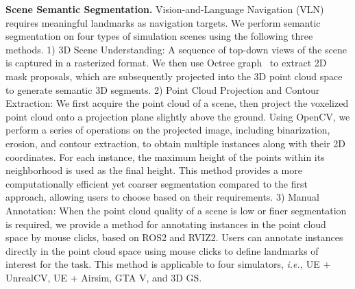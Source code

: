 \textbf{Scene Semantic Segmentation.} 
Vision-and-Language Navigation (VLN) requires meaningful landmarks as navigation targets. We perform semantic segmentation on four types of simulation scenes using the following three methods. 1) 3D Scene Understanding: A sequence of top-down views of the scene is captured in a rasterized format. We then use Octree graph~\cite{octree_graph} to extract 2D mask proposals, which are subsequently projected into the 3D point cloud space to generate semantic 3D segments. 2) Point Cloud Projection and Contour Extraction: We first acquire the point cloud of a scene, then project the voxelized point cloud onto a projection plane slightly above the ground. Using OpenCV, we perform a series of operations on the projected image, including binarization, erosion, and contour extraction, to obtain multiple instances along with their 2D coordinates. For each instance, the maximum height of the points within its neighborhood is used as the final height. This method provides a more computationally efficient yet coarser segmentation compared to the first approach, allowing users to choose based on their requirements. 3) Manual Annotation: When the point cloud quality of a scene is low or finer segmentation is required, we provide a method for annotating instances in the point cloud space by mouse clicks, based on ROS2 and RVIZ2. Users can annotate instances directly in the point cloud space using mouse clicks to define landmarks of interest for the task. This method is applicable to four simulators, \emph{i.e.,} UE + UnrealCV, UE + Airsim, GTA V, and 3D GS.

\begin{comment}
\begin{figure}
    \centering
    \begin{subfigure}[b]{0.15\textwidth}   %
        \centering
        \texttt{[image: Fig/whole\_scene.pdf]} %
        \caption{}
        \label{fig:sub1}
    \end{subfigure}
    \hfill  %
    \begin{subfigure}[b]{0.15\textwidth}
        \centering
        \texttt{[image: Fig/scene\_point\_cloud.pdf]}
        \caption{}
        \label{fig:sub2}
    \end{subfigure}
    \hfill
    \begin{subfigure}[b]{0.15\textwidth}
        \centering
        \texttt{[image: Fig/scene\_seg.pdf]}
        \caption{}
        \label{fig:sub3}
    \end{subfigure}
    
    \caption{Illustration of results obtained by our point cloud acquisition and semantic segmentation tools. (a) Overview of an urban scene. (b) The point cloud of (a). (c) The semantic segmentation of (a).}
    \label{fig:main}
\end{figure}
\end{comment}


